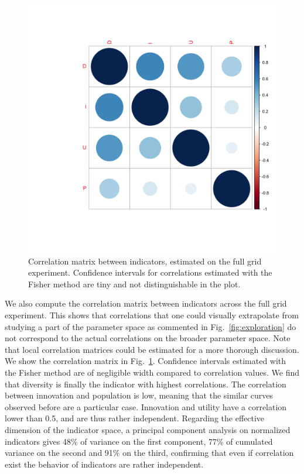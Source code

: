 \documentclass[letterpaper]{article}
\begin{document}
\begin{figure}[t]
	\centering
	\includegraphics[width=\linewidth,trim={6cm 6cm 0 6cm}]{figures/corrmat_indics.png}
	\caption{Correlation matrix between indicators, estimated on the full grid experiment. Confidence intervals for correlations estimated with the Fisher method are tiny and not distinguishable in the plot.\label{fig:cormat}}
\end{figure}


We also compute the correlation matrix between indicators across the full grid experiment. This shows that correlations that one could visually extrapolate from studying a part of the parameter space as commented in Fig.~\ref{fig:exploration} do not correspond to the actual correlations on the broader parameter space. Note that local correlation matrices could be estimated for a more thorough discussion. We show the correlation matrix in Fig.~\ref{fig:cormat}. Confidence intervals estimated with the Fisher method are of negligible width compared to correlation values. We find that diversity is finally the indicator with highest correlations. The correlation between innovation and population is low, meaning that the similar curves observed before are a particular case. Innovation and utility have a correlation lower than 0.5, and are thus rather independent. Regarding the effective dimension of the indicator space, a principal component analysis on normalized indicators gives 48\% of variance on the first component, 77\% of cumulated variance on the second and 91\% on the third, confirming that even if correlation exist the behavior of indicators are rather independent.
\end{document}
